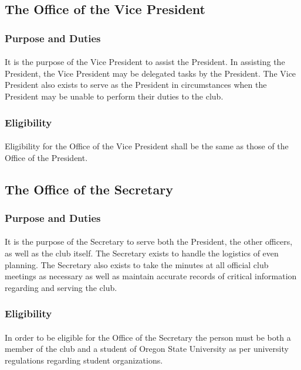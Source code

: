 \documentclass[12pt]{article}
\begin{document}
\subsection{The Office of the Vice President}
\subsubsection{Purpose and Duties}
\paragraph{}
It is the purpose of the Vice President to assist the President. In assisting the President, the Vice President may be delegated tasks by the President. The Vice President also exists to serve as the 
President in circumstances when the President may be unable to perform their duties to the club.
\subsubsection{Eligibility}
\paragraph{}
Eligibility for the Office of the Vice President shall be the same as those of the Office of the President.

\subsection{The Office of the Secretary}
\subsubsection{Purpose and Duties}
\paragraph{}
It is the purpose of the Secretary to serve both the President, the other officers, as well as the club itself. The Secretary exists to handle the logistics of even planning. The Secretary also exists
to take the minutes at all official club meetings as necessary as well as maintain accurate records of critical information regarding and serving the club.
\subsubsection{Eligibility}
\paragraph{}
In order to be eligible for the Office of the Secretary the person must be both a member of the club and a student of Oregon State University as per university regulations regarding student organizations.
\end{document}

